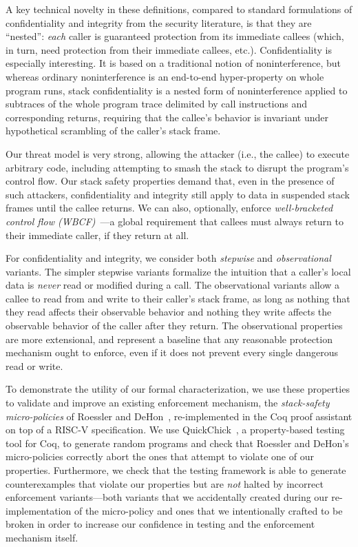 \documentclass[10pt,conference]{ieeetran}%
\theoremstyle{definition}
\begin{document}
A key technical novelty in these definitions,
compared to standard formulations of confidentiality and integrity from the
security literature, is that they
are ``nested'': {\em each} caller is guaranteed protection from its
immediate callees (which, in turn, need protection from their immediate
callees, etc.).
Confidentiality is especially interesting. It is based on a traditional
notion of noninterference, but whereas ordinary noninterference
is an end-to-end hyper-property on whole program runs, stack
confidentiality is a nested form of noninterference applied to
subtraces of the whole program trace delimited by call instructions
and corresponding returns, requiring that the callee’s behavior is
invariant under hypothetical scrambling of the caller’s stack frame.

Our threat model is very strong, allowing the attacker (i.e., the
callee) to execute arbitrary code, including attempting to smash
the stack to disrupt the program’s control flow. Our stack safety
properties demand that, even in the presence of such attackers, confidentiality
and integrity still apply to data in suspended stack frames
until the callee returns.
%
We can also, optionally, enforce {\em well-bracketed control
flow (WBCF)}~\cite{SkorstengaardSTKJFP}---a global requirement that
callees must always return to their immediate caller, if they return
at all.

For confidentiality and integrity, we consider both {\em stepwise}
and {\em observational} variants.  The simpler stepwise
variants formalize the intuition that a caller's local data is {\em never}
read or modified during a call. The observational variants
allow a callee to read from and write to their caller's stack frame, as
long as nothing that they read affects their observable behavior and nothing
they write affects the observable behavior of the caller after they return.
The observational properties are more extensional, and represent a baseline
that any reasonable protection mechanism ought to enforce,
even if it does not prevent every single dangerous read or write.

To demonstrate the utility of our formal characterization, we use these
properties to validate and improve an existing enforcement mechanism, the
{\em stack-safety micro-policies} of Roessler and DeHon~\cite{DBLP:conf/sp/RoesslerD18}, re-implemented
in the Coq proof assistant on top of a RISC-V specification.  We
use QuickChick~\cite{Denes:VSL2014,Pierce:SF4}, a property-based testing
tool for Coq, to generate random programs and check
that Roessler and DeHon's micro-policies correctly abort the ones that
attempt to violate one of our properties. Furthermore, we
%
check that the testing framework is able to generate counterexamples
that violate our properties but are \emph{not} halted by incorrect
enforcement variants---both variants that we accidentally created
during our re-implementation of the micro-policy and ones that we
intentionally crafted to be broken in order to increase our confidence
in testing and the enforcement mechanism itself.
\end{document}
